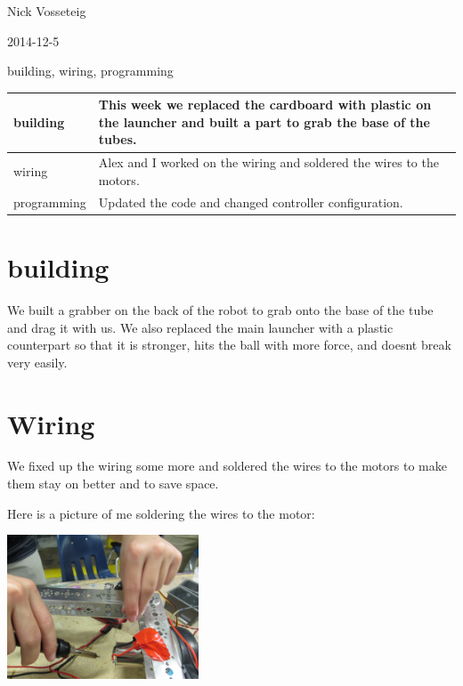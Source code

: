Nick Vosseteig

2014-12-5

building, wiring, programming

\begin{tabular}{|p{5cm}|p{5cm}|}
 \hline
 building&
This week we replaced the cardboard with plastic on the launcher and built a part to grab the base of the tubes.
 \\
 \hline
wiring&
Alex and I worked on the wiring and soldered the wires to the motors.
 \\
 \hline
programming&
Updated the code and changed controller configuration.
 \\
 \hline
\end{tabular}

\section*{building}
We built a grabber on the back of the robot to grab onto the base of the tube and drag it with us. We also replaced the main launcher with a plastic counterpart so that it is stronger, hits the ball with more force, and doesnt break very easily.
\section*{Wiring}
We fixed up the wiring some more and soldered the wires to the motors to make them stay on better and to save space.

Here is a picture of me soldering the wires to the motor:
\begin{center}
 \includegraphics[width=215px]{./Entries/Images/nick_soldering.jpg}
\end{center}